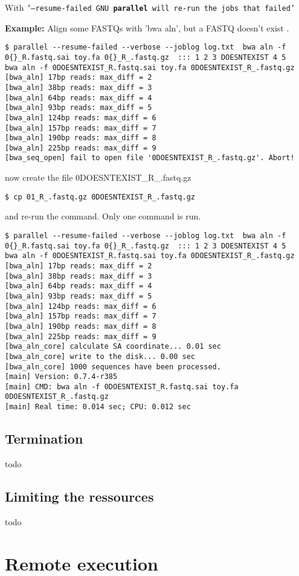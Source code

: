 \documentclass{article}
\newcommand{\example}[1]{
\textbf{Example: } {\color[rgb]{0,0,1} #1 } .
}
\newcommand{\cmdoption}[1]{\texttt{'#1'}}
\def\prl{\textbf{parallel}}
\begin{document}
With \cmdoption{--resume-failed GNU \prl{} will re-run the jobs that failed}
\example{Align some FASTQs with 'bwa aln', but a FASTQ doesn't exist}
\begin{lstlisting}
$ parallel --resume-failed --verbose --joblog log.txt  bwa aln -f 0{}_R.fastq.sai toy.fa 0{}_R_.fastq.gz  ::: 1 2 3 DOESNTEXIST 4 5
bwa aln -f 0DOESNTEXIST_R.fastq.sai toy.fa 0DOESNTEXIST_R_.fastq.gz
[bwa_aln] 17bp reads: max_diff = 2
[bwa_aln] 38bp reads: max_diff = 3
[bwa_aln] 64bp reads: max_diff = 4
[bwa_aln] 93bp reads: max_diff = 5
[bwa_aln] 124bp reads: max_diff = 6
[bwa_aln] 157bp reads: max_diff = 7
[bwa_aln] 190bp reads: max_diff = 8
[bwa_aln] 225bp reads: max_diff = 9
[bwa_seq_open] fail to open file '0DOESNTEXIST_R_.fastq.gz'. Abort!
\end{lstlisting}
now create the file 0DOESNTEXIST\_R\_.fastq.gz 
\begin{lstlisting}
$ cp 01_R_.fastq.gz 0DOESNTEXIST_R_.fastq.gz
\end{lstlisting}
and re-run the command. Only one command is run.
\begin{lstlisting}
$ parallel --resume-failed --verbose --joblog log.txt  bwa aln -f 0{}_R.fastq.sai toy.fa 0{}_R_.fastq.gz  ::: 1 2 3 DOESNTEXIST 4 5
bwa aln -f 0DOESNTEXIST_R.fastq.sai toy.fa 0DOESNTEXIST_R_.fastq.gz
[bwa_aln] 17bp reads: max_diff = 2
[bwa_aln] 38bp reads: max_diff = 3
[bwa_aln] 64bp reads: max_diff = 4
[bwa_aln] 93bp reads: max_diff = 5
[bwa_aln] 124bp reads: max_diff = 6
[bwa_aln] 157bp reads: max_diff = 7
[bwa_aln] 190bp reads: max_diff = 8
[bwa_aln] 225bp reads: max_diff = 9
[bwa_aln_core] calculate SA coordinate... 0.01 sec
[bwa_aln_core] write to the disk... 0.00 sec
[bwa_aln_core] 1000 sequences have been processed.
[main] Version: 0.7.4-r385
[main] CMD: bwa aln -f 0DOESNTEXIST_R.fastq.sai toy.fa 0DOESNTEXIST_R_.fastq.gz
[main] Real time: 0.014 sec; CPU: 0.012 sec
\end{lstlisting}
\subsection{Termination}
todo

\subsection{Limiting the ressources}
todo

\section{Remote execution}
\end{document}
